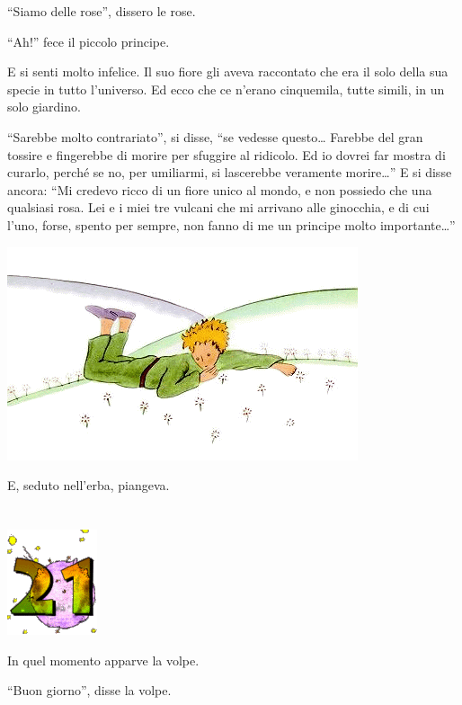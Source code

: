 \documentclass[11pt]{scrbook}
\begin{document}
``Siamo delle rose'', dissero le rose.

``Ah!'' fece il piccolo principe.

E si senti molto infelice. Il suo fiore gli aveva raccontato che era il
solo della sua specie in tutto l'universo. Ed ecco che ce n'erano
cinquemila, tutte simili, in un solo giardino.

``Sarebbe molto contrariato'', si disse, ``se vedesse questo\ldots{}
Farebbe del gran tossire e fingerebbe di morire per sfuggire al
ridicolo. Ed io dovrei far mostra di curarlo, perché se no, per
umiliarmi, si lascerebbe veramente morire\ldots{}'' E si disse ancora:
``Mi credevo ricco di un fiore unico al mondo, e non possiedo che una
qualsiasi rosa. Lei e i miei tre vulcani che mi arrivano alle ginocchia,
e di cui l'uno, forse, spento per sempre, non fanno di me un principe
molto importante\ldots{}''

\begin{center}
\includegraphics{img/20b}
\end{center}

E, seduto nell'erba, piangeva.

\chapter{}
\begin{center}
\includegraphics{img/chapter21}
\end{center}

In quel momento apparve la volpe.

``Buon giorno'', disse la volpe.
\end{document}
